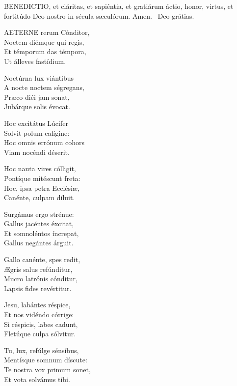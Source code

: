 

\lettrine[lines=2]{B}{ENEDICTIO}, et cláritas, et sapiéntia, et gratiárum áctio, honor, virtus, et fortitúdo Deo nostro in sécula sæculórum. Amen. \R\ Deo grátias.



\lettrine[lines=2]{A}{ETERNE} rerum Cónditor,\\
Noctem diémque qui regis,\\
Et témporum das témpora,\\
Ut álleves fastídium.

Noctúrna lux viántibus\\
A nocte noctem ségregans,\\
Præco diéi jam sonat,\\
Jubárque solis évocat.

Hoc excitátus Lúcifer\\
Solvit polum calígine:\\
Hoc omnis errónum cohors\\
Viam nocéndi déserit.

Hoc nauta vires cólligit,\\
Pontíque mitéscunt freta:\\
Hoc, ipsa petra Ecclésiæ,\\
Canénte, culpam díluit.

Surgámus ergo strénue:\\
Gallus jacéntes éxcitat,\\
Et somnoléntos íncrepat,\\
Gallus negántes árguit.

Gallo canénte, spes redit,\\
Ægris salus refúnditur,\\
Mucro latrónis cónditur,\\
Lapsis fides revértitur.

Jesu, labántes réspice,\\
Et nos vidéndo córrige:\\
Si réspicis, labes cadunt,\\
Fletúque culpa sólvitur.

Tu, lux, refúlge sénsibus,\\
Mentísque somnum díscute:\\
Te nostra vox primum sonet,\\
Et vota solvámus tibi.

